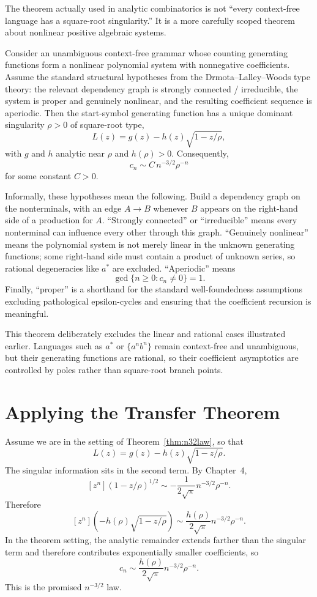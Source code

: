 The theorem actually used in analytic combinatorics is not ``every context-free language has a square-root singularity.'' It is a more carefully scoped theorem about nonlinear positive algebraic systems.

\begin{theorem}
\label{thm:n32law}
Consider an unambiguous context-free grammar whose counting generating functions form a nonlinear polynomial system with nonnegative coefficients. Assume the standard structural hypotheses from the Drmota--Lalley--Woods type theory: the relevant dependency graph is strongly connected / irreducible, the system is proper and genuinely nonlinear, and the resulting coefficient sequence is aperiodic. Then the start-symbol generating function has a unique dominant singularity $\rho > 0$ of square-root type,
\[
  L(z) = g(z) - h(z)\sqrt{1-z/\rho},
\]
with $g$ and $h$ analytic near $\rho$ and $h(\rho) > 0$. Consequently,
\[
  c_n \sim C\,n^{-3/2}\rho^{-n}
\]
for some constant $C>0$.
\end{theorem}

Informally, these hypotheses mean the following. Build a dependency graph on the nonterminals, with an edge $A \to B$ whenever $B$ appears on the right-hand side of a production for $A$. ``Strongly connected'' or ``irreducible'' means every nonterminal can influence every other through this graph. ``Genuinely nonlinear'' means the polynomial system is not merely linear in the unknown generating functions; some right-hand side must contain a product of unknown series, so rational degeneracies like $a^*$ are excluded. ``Aperiodic'' means
\[
  \gcd\{n \ge 0 : c_n \ne 0\} = 1.
\]
Finally, ``proper'' is a shorthand for the standard well-foundedness assumptions excluding pathological epsilon-cycles and ensuring that the coefficient recursion is meaningful.

This theorem deliberately excludes the linear and rational cases illustrated earlier. Languages such as $a^*$ or $\{a^n b^n\}$ remain context-free and unambiguous, but their generating functions are rational, so their coefficient asymptotics are controlled by poles rather than square-root branch points.

\section{Applying the Transfer Theorem}

Assume we are in the setting of Theorem~\ref{thm:n32law}, so that
\[
  L(z) = g(z) - h(z)\sqrt{1-z/\rho}.
\]
The singular information sits in the second term. By Chapter~4,
\[
  [z^n]\left(1-z/\rho\right)^{1/2}
  \sim -\frac{1}{2\sqrt{\pi}} n^{-3/2}\rho^{-n}.
\]
Therefore
\[
  [z^n]\left(-h(\rho)\sqrt{1-z/\rho}\right)
  \sim \frac{h(\rho)}{2\sqrt{\pi}} n^{-3/2}\rho^{-n}.
\]
In the theorem setting, the analytic remainder extends farther than the singular term and therefore contributes exponentially smaller coefficients, so
\[
  c_n \sim \frac{h(\rho)}{2\sqrt{\pi}} n^{-3/2}\rho^{-n}.
\]
This is the promised $n^{-3/2}$ law.


